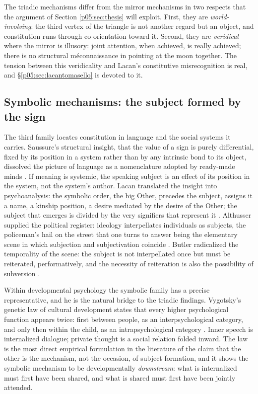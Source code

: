 The triadic mechanisms differ from the mirror mechanisms in two respects that the argument of Section \ref{p05:sec:thesis} will exploit. First, they are \emph{world-involving}: the third vertex of the triangle is not another regard but an object, and constitution runs through co-orientation toward it. Second, they are \emph{veridical} where the mirror is illusory: joint attention, when achieved, is really achieved; there is no structural m\'econnaissance in pointing at the moon together. The tension between this veridicality and Lacan's constitutive misrecognition is real, and §\ref{p05:sec:lacantomasello} is devoted to it.

\subsection{Symbolic mechanisms: the subject formed by the sign}
\label{p05:sec:symbolic}

The third family locates constitution in language and the social systems it carries. Saussure's structural insight, that the value of a sign is purely differential, fixed by its position in a system rather than by any intrinsic bond to its object, dissolved the picture of language as a nomenclature adopted by ready-made minds \parencite{saussure1959}. If meaning is systemic, the speaking subject is an effect of its position in the system, not the system's author. Lacan translated the insight into psychoanalysis: the symbolic order, the big Other, precedes the subject, assigns it a name, a kinship position, a desire mediated by the desire of the Other; the subject that emerges is divided by the very signifiers that represent it \parencite{lacan2006}. Althusser supplied the political register: ideology interpellates individuals as subjects, the policeman's hail on the street that one turns to answer being the elementary scene in which subjection and subjectivation coincide \parencite{althusser1971}. Butler radicalized the temporality of the scene: the subject is not interpellated once but must be reiterated, performatively, and the necessity of reiteration is also the possibility of subversion \parencite{butler1997}.

Within developmental psychology the symbolic family has a precise representative, and he is the natural bridge to the triadic findings. Vygotsky's genetic law of cultural development states that every higher psychological function appears twice: first between people, as an interpsychological category, and only then within the child, as an intrapsychological category \parencite{vygotsky1978}. Inner speech is internalized dialogue; private thought is a social relation folded inward. The law is the most direct empirical formulation in the literature of the claim that the other is the mechanism, not the occasion, of subject formation, and it shows the symbolic mechanism to be developmentally \emph{downstream}: what is internalized must first have been shared, and what is shared must first have been jointly attended.


